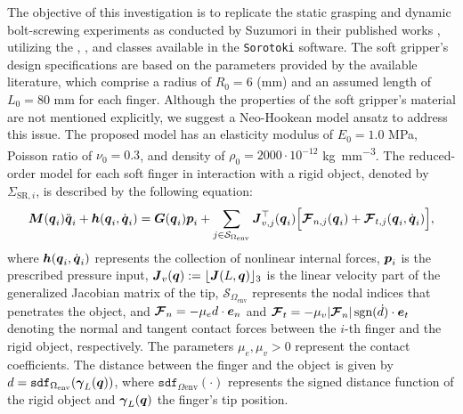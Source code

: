 The objective of this investigation is to replicate the static grasping and dynamic bolt-screwing experiments as conducted by Suzumori in their published works \cite{Suzumori1991, Suzumori1992}, utilizing the , , and  classes available in the \texttt{Sorotoki} software. The soft gripper's design specifications are based on the parameters provided by the available literature, which comprise a radius of $R_0 = 6$ (\si{\milli \meter}) and an assumed length of $L_0 = 80$ \si{\milli \meter} for each finger. Although the properties of the soft gripper's material are not mentioned explicitly, we suggest a Neo-Hookean model ansatz to address this issue. The proposed model has an elasticity modulus of $E_0 = 1.0$ \si{\mega \pascal}, Poisson ratio of $\nu_0 = 0.3$, and density of $\rho_0 = 2000 \cdot 10^{-12}$ \si{\kilo \gram \per \milli \metre \cubed}. The reduced-order model for each soft finger in interaction with a rigid object, denoted by $\Sigma_{\textrm{SR},i}$, is described by the following equation:
%
\begin{multline}
    \boldsymbol{M}({\boldsymbol{q}}_i) \ddot{{\boldsymbol{q}}}_i  + {\boldsymbol{h}}({\boldsymbol{q}}_i,{\dot{\boldsymbol{q}}}_i)  =  {\boldsymbol{G}}({\boldsymbol{q}}_i) {\boldsymbol{p}}_i +  \sum_{j\in \mathcal{S}_{\Omega_{\textrm{env}}}} {\boldsymbol{J}}_{v,j}^\top({\boldsymbol{q}}_i) \Big[ {\boldsymbol{\mathcal{F}}}_{{n},j}({\boldsymbol{q}}_i) + {\boldsymbol{\mathcal{F}}}_{{t,j}}({\boldsymbol{q}}_i,\dot{{\boldsymbol{q}}}_i)\Big],
    \label{eq:suzumori_fingermodel_lagrangian}
\end{multline}
%
where ${\boldsymbol{h}}({\boldsymbol{q}}_i,{\dot{\boldsymbol{q}}}_i)$ represents the collection of nonlinear internal forces, ${\boldsymbol{p}}_i$ is the prescribed pressure input, ${\boldsymbol{J}}_v({\boldsymbol{q}}):= \lfloor{\boldsymbol{J}}(L,{\boldsymbol{q}})\rfloor_3$ is the linear velocity part of the generalized Jacobian matrix of the tip, $\mathcal{S}_{\Omega_{\textrm{env}}}$ represents the nodal indices that penetrates the object, and $
{\boldsymbol{\mathcal{F}}}_{{n}} = -\mu_e d \cdot \boldsymbol{e}_n$ and ${\boldsymbol{\mathcal{F}}}_{{t}} = -\mu_v |{\boldsymbol{\mathcal{F}}}_{{n}}| \, \textrm{sgn}(\dot{d}) \cdot \boldsymbol{e}_t$ 
denoting the normal and tangent contact forces between the $i$-th finger and the rigid object, respectively. The parameters $\mu_e, \mu_v > 0$ represent the contact coefficients. The distance between the finger and the object is given by $d = \texttt{sdf}_{\Omega_{\textrm{env}}}({\boldsymbol{\gamma}}_L({\boldsymbol{q}}))$, where $\texttt{sdf}_{\Omega{\textrm{env}}}(\cdot)$ represents the signed distance function of the rigid object and ${\boldsymbol{\gamma}}_L({\boldsymbol{q}})$ the finger's tip position. 

